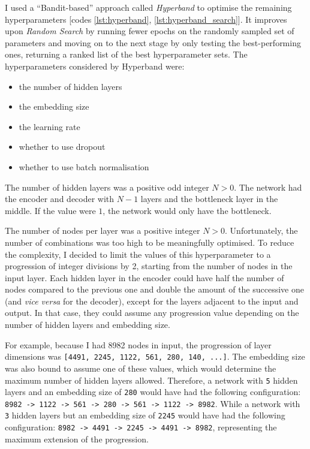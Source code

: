 I used a ``Bandit-based'' approach called \textit{Hyperband} \cite{DBLP:journals/corr/LiJDRT16} to optimise the remaining hyperparameters
[codes \ref{lst:hyperband}, \ref{lst:hyperband_search}].
It improves upon \textit{Random Search} by running fewer epochs on the randomly sampled set of parameters
and moving on to the next stage by only testing the best-performing ones, returning a ranked list of the best hyperparameter sets.
The hyperparameters considered by Hyperband were:

\begin{itemize}
  \item the number of hidden layers
  \item the embedding size
  \item the learning rate
  \item whether to use dropout
  \item whether to use batch normalisation
\end{itemize}

The number of hidden layers was a positive odd integer $N > 0$.
The network had the encoder and decoder with $N-1$ layers and the bottleneck layer in the middle.
If the value were $1$, the network would only have the bottleneck.

The number of nodes per layer was a positive integer $N > 0$.
Unfortunately, the number of combinations was too high to be meaningfully optimised.
To reduce the complexity, I decided to limit the values of this hyperparameter to a progression of integer divisions by 2,
starting from the number of nodes in the input layer.
Each hidden layer in the encoder could have half the number of nodes compared to the previous one and double the amount of the successive one
(and \textit{vice versa} for the decoder), except for the layers adjacent to the input and output.
In that case, they could assume any progression value depending on the number of hidden layers and embedding size.

For example, because I had 8982 nodes in input, the progression of layer dimensions
was \verb|[4491, 2245, 1122, 561, 280, 140, ...]|.
The embedding size was also bound to assume one of these values, which would determine
the maximum number of hidden layers allowed.
Therefore, a network with \verb|5| hidden layers and an embedding size of \verb|280|
would have had the following configuration: \verb|8982 -> 1122 -> 561 -> 280 -> 561 -> 1122 -> 8982|.
While a network with \verb|3| hidden layers but an embedding size of \verb|2245| would have had the following configuration:
\verb|8982 -> 4491 -> 2245 -> 4491 -> 8982|, representing the maximum extension of the progression.

